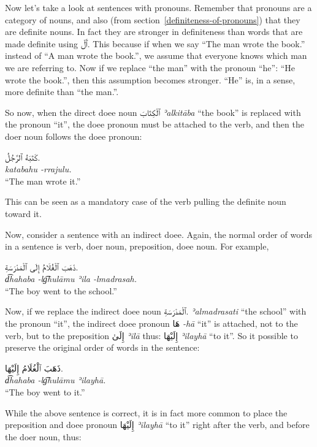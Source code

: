 \documentclass[
  10pt,
]{book}
\begin{document}
Now let's take a look at sentences with pronouns. Remember that pronouns are a category of nouns, and also (from section~\ref{definiteness-of-pronouns}) that they are definite nouns. In fact they are stronger in definiteness than words that are made definite using \foreignlanguage{arabic}{ٱَلْ}. This because if when we say \enquote{The man wrote the book.} instead of \enquote{A man wrote the book.}, we assume that everyone knows which man we are referring to. Now if we replace \enquote{the man} with the pronoun \enquote{he}: \enquote{He wrote the book.}, then this assumption becomes stronger. \enquote{He} is, in a sense, more definite than \enquote{the man.}.

So now, when the direct doee noun \foreignlanguage{arabic}{ٱلْکِتَابَ} \emph{ʾalkitāba} \enquote{the book} is replaced with the pronoun \enquote{it}, the doee pronoun must be attached to the verb, and then the doer noun follows the doee pronoun:

\foreignlanguage{arabic}{کَتَبَهُ ٱلرَّجُلُ.}\\
\emph{katabahu -rrajulu.}\\
\enquote{The man wrote it.}

This can be seen as a mandatory case of the verb pulling the definite noun toward it.

Now, consider a sentence with an indirect doee. Again, the normal order of words in a sentence is verb, doer noun, preposition, doee noun. For example,

\foreignlanguage{arabic}{ذَهَبَ ٱلْغُلَامُ إِلَى ٱلْمَدْرَسَةِ.}\\
\emph{d͡hahaba -lg͡hulāmu ʾila -lmadrasah.}\\
\enquote{The boy went to the school.}

Now, if we replace the indirect doee noun \foreignlanguage{arabic}{ٱلْمَدْرَسَةِ.} \emph{ʾalmadrasati} \enquote{the school} with the pronoun \enquote{it}, the indirect doee pronoun \foreignlanguage{arabic}{هَا} \emph{-hā} \enquote{it} is attached, not to the verb, but to the preposition \foreignlanguage{arabic}{إِلَىٰ} \emph{ʾilā} thus: \foreignlanguage{arabic}{إِلَيْهَا} \emph{ʾilayhā} \enquote{to it}. So it possible to preserve the original order of words in the sentence:

\foreignlanguage{arabic}{ذَهَبَ ٱلْغُلَامُ إِلَيْهَا.}\\
\emph{d͡hahaba -lg͡hulāmu ʾilayhā.}\\
\enquote{The boy went to it.}

While the above sentence is correct, it is in fact more common to place the preposition and doee pronoun \foreignlanguage{arabic}{إِلَيْهَا} \emph{ʾilayhā} \enquote{to it} right after the verb, and before the doer noun, thus:
\end{document}
